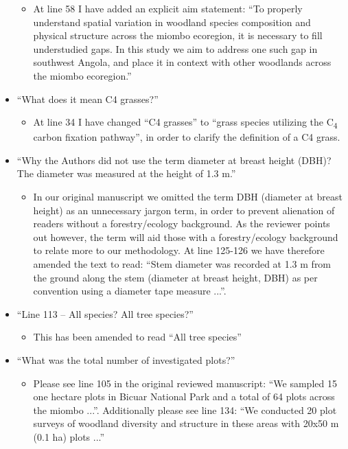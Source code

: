 \documentclass[a4paper]{letter}
\begin{document}
\begin{letter}{}
\begin{itemize}
		\begin{itemize}
			\item{At line 58 I have added an explicit aim statement: ``To properly understand spatial variation in woodland species composition and physical structure across the miombo ecoregion, it is necessary to fill understudied gaps. In this study we aim to address one such gap in southwest Angola, and place it in context with other woodlands across the miombo ecoregion.''}
		\end{itemize}
	\item{``What does it mean C4 grasses?''}
		\begin{itemize}
			\item{At line 34 I have changed ``C4 grasses'' to ``grass species utilizing the C\textsubscript{4} carbon fixation pathway'', in order to clarify the definition of a C4 grass.}
		\end{itemize}
	\item{``Why the Authors did not use the term diameter at breast height (DBH)? The diameter was measured at the height of 1.3 m.''}
		\begin{itemize}
			\item{In our original manuscript we omitted the term DBH (diameter at breast height) as an unnecessary jargon term, in order to prevent alienation of readers without a forestry/ecology background. As the reviewer points out however, the term will aid those with a forestry/ecology background to relate more to our methodology. At line 125-126 we have therefore amended the text to read: ``Stem diameter was recorded at 1.3 m from the ground along the stem (diameter at breast height, DBH) as per convention using a diameter tape measure ...''.}
		\end{itemize}
	\item{``Line 113 – All species? All tree species?''}
		\begin{itemize}
			\item{This has been amended to read ``All tree species''}
		\end{itemize}
	\item{``What was the total number of investigated plots?''}
		\begin{itemize}
			\item{Please see line 105 in the original reviewed manuscript: ``We sampled 15 one hectare plots in Bicuar National Park and a total of 64 plots across the miombo ...''. Additionally please see line 134: ``We conducted 20 plot surveys of woodland diversity and structure in these areas with 20x50 m (0.1 ha) plots ...''}

\end{itemize}
\end{itemize}
\end{letter}
\end{document}
